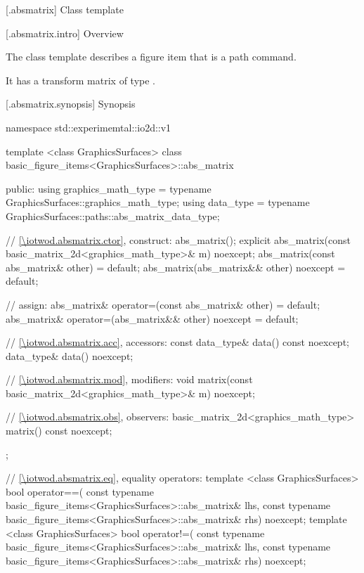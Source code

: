  [\iotwod.absmatrix] {Class template }

 [\iotwod.absmatrix.intro] {Overview}

\pnum
{}%
The class template  describes a figure item that is a path command.

\pnum
It has a transform matrix of type .

 [\iotwod.absmatrix.synopsis] {Synopsis}
\begin{codeblock}
namespace std::experimemtal::io2d::v1 {
  template <class GraphicsSurfaces>
  class basic_figure_items<GraphicsSurfaces>::abs_matrix {
  public:
    using graphics_math_type = typename GraphicsSurfaces::graphics_math_type;
    using data_type =
      typename GraphicsSurfaces::paths::abs_matrix_data_type;

    // \ref{\iotwod.absmatrix.ctor}, construct:
    abs_matrix();
    explicit abs_matrix(const basic_matrix_2d<graphics_math_type>& m) noexcept;
    abs_matrix(const abs_matrix& other) = default;
    abs_matrix(abs_matrix&& other) noexcept = default;

    // assign:
    abs_matrix& operator=(const abs_matrix& other) = default;
    abs_matrix& operator=(abs_matrix&& other) noexcept = default;

    // \ref{\iotwod.absmatrix.acc}, accessors:
    const data_type& data() const noexcept;
    data_type& data() noexcept;

    // \ref{\iotwod.absmatrix.mod}, modifiers:
    void matrix(const basic_matrix_2d<graphics_math_type>& m) noexcept;

    // \ref{\iotwod.absmatrix.obs}, observers:
    basic_matrix_2d<graphics_math_type> matrix() const noexcept;
  };
  
  // \ref{\iotwod.absmatrix.eq}, equality operators:
  template <class GraphicsSurfaces>
  bool operator==(
    const typename basic_figure_items<GraphicsSurfaces>::abs_matrix& lhs,
    const typename basic_figure_items<GraphicsSurfaces>::abs_matrix& rhs) 
    noexcept;  
  template <class GraphicsSurfaces>
  bool operator!=(
    const typename basic_figure_items<GraphicsSurfaces>::abs_matrix& lhs,
    const typename basic_figure_items<GraphicsSurfaces>::abs_matrix& rhs) 
    noexcept;  
}
\end{codeblock}

